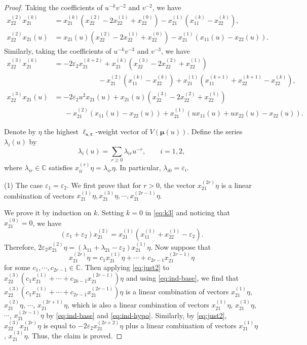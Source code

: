 \documentclass[11pt,reqno]{amsart}
\numberwithin{equation}{section}
\theoremstyle{definition}
\theoremstyle{remark}
\newcommand{\beq}{\begin{equation}}
\newcommand{\eeq}{\end{equation}}
\newcommand{\bC}{\mathbb{C}}
\newcommand{\gge}{\geqslant}
\newcommand{\la}{\lambda}
\newcommand{\ve}{\varepsilon}
\newcommand{\s}{{\bm s}}
\begin{document}
\begin{proof}
Taking the coefficients of $u^{-k}v^{-2}$ and $v^{-2}$, we have
\begin{align}
x^{(2)}_{22}x_{21}^{(k)}&=x_{21}^{(k)}(x_{22}^{(2)}-2x_{22}^{(1)}+x_{22}^{(0)})-x_{21}^{(1)}(x_{11}^{(k)}-x_{22}^{(k)}),\label{eq:k2}\\
x^{(2)}_{22}x_{21}(u)&=x_{21}(u)(x_{22}^{(2)}-2x_{22}^{(1)}+x_{22}^{(0)})-x_{21}^{(1)}(x_{11}(u)-x_{22}(u)).\label{eq:just2}
\end{align}
Similarly, taking the coefficients of $u^{-k}v^{-3}$ and $v^{-3}$, we have
\begin{align}
x^{(3)}_{22}x_{21}^{(k)}&=-2\ve_2x_{21}^{(k+2)}+x_{21}^{(k)}(x_{22}^{(3)}-2x_{22}^{(2)}+x_{22}^{(1)})\nonumber \\ &\qquad\qquad\qquad\,  -x_{21}^{(2)}(x_{11}^{(k)}-x_{22}^{(k)})+x_{21}^{(1)}(x_{11}^{(k+1)}+x_{22}^{(k+1)}-x_{22}^{(k)}),\label{eq:k3}\\
x^{(3)}_{22}x_{21}(u)&=-2\ve_2u^2x_{21}(u)+x_{21}(u)(x_{22}^{(3)}-2x_{22}^{(2)}+x_{22}^{(1)})\nonumber\\&\quad \ \  -x_{21}^{(2)}(x_{11}(u)-x_{22}(u))+x_{21}^{(1)}(ux_{11}(u)+ux_{22}(u)-x_{22}(u)).\label{eq:just3}
\end{align}

Denote by $\eta$ the highest $\ell_{\s,\bm\ve}$-weight vector of $V(\bm\mu(u))$.  Define the series $\la_i(u)$ by
\[
\la_i(u)=\sum_{r\gge 0} \la_{ir}u^{-r},\qquad i=1,2,
\]
where $\la_{ir}\in\bC$ satisfies $x_{ii}^{(r)}\eta=\la_{ir}\eta$. In particular, $\la_{i0}=\ve_i$.

(1) The case $\ve_1=\ve_2$. We first prove that for $r>0$, the vector $x_{21}^{(2r)}\eta$ is a linear combination of vectors $x_{21}^{(1)}\eta,x_{21}^{(3)}\eta,\cdots,x_{21}^{(2r-1)}\eta$.

We prove it by induction on $k$. Setting $k=0$ in \eqref{eq:k3} and noticing that $x_{21}^{(0)}=0$, we have
\beq\label{eq:ind-base}
(\ve_1+\ve_2)x_{21}^{(2)}=x_{21}^{(1)}(x_{11}^{(1)}+x_{22}^{(1)}-\ve_2).
\eeq
Therefore, $2\ve_2x_{21}^{(2)}\eta=(\la_{11}+\la_{21}-\ve_2)x_{21}^{(1)}\eta$. Now suppose that
\beq\label{eq:ind-hypo}
x_{21}^{(2r)}\eta=c_1x_{21}^{(1)}\eta+\cdots+c_{2r-1}x_{21}^{(2r-1)}\eta
\eeq
for some $c_1,\cdots,c_{2r-1}\in\bC$. Then applying \eqref{eq:just2} to $x_{22}^{(3)}(c_1x_{21}^{(1)}+\cdots+c_{2k-1}x_{21}^{(2r-1)})\eta$ and using \eqref{eq:ind-base}, we find that $x_{22}^{(3)}(c_1x_{21}^{(1)}+\cdots+c_{2r-1}x_{21}^{(2r-1)})\eta$ is a linear combination of vectors $x_{21}^{(1)}\eta$, $x_{21}^{(2)}\eta$, $\cdots$, $x_{21}^{(2r+1)}\eta$, which is also a linear combination of vectors $x_{21}^{(1)}\eta$, $x_{21}^{(3)}\eta$, $\cdots$, $x_{21}^{(2r-1)}\eta$ by \eqref{eq:ind-base} and \eqref{eq:ind-hypo}. Similarly, by \eqref{eq:just2}, $x_{22}^{(3)}x_{21}^{(2r)}\eta$ is equal to $-2\ve_2x_{21}^{(2r+2)}\eta$ plus a linear combination of vectors $x_{21}^{(1)}\eta$, $x_{21}^{(3)}\eta$. Thus, the claim is proved.


\end{proof}
\end{document}
